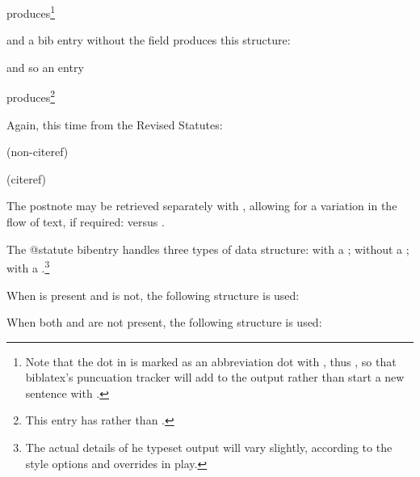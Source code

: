 produces\footnote{Note that the dot  in  is marked as an abbreviation dot with , thus , so that biblatex's puncuation tracker will add  to the output rather than start a new sentence with .}
\begin{myquotation}
\end{myquotation}
and a bib entry without the  field produces this structure:

\begin{myquotation}
\end{myquotation}
and so an entry

produces\footnote{This entry has  rather than .}
\begin{myquotation}
\end{myquotation}

\p Again, this time from the Revised Statutes:
\begin{myquotation}
\noindent{} {\footnotesize (non-citeref)}

\noindent{} {\footnotesize (citeref)}
\end{myquotation}

\p The postnote may be retrieved separately with , allowing for a variation in the flow of text, if required:  versus .

\p The @statute bibentry handles three types of data structure: with a ; without a ; with a .\footnote{The actual details of he typeset output will vary slightly, according to the style options and overrides in play.}

\p When  is present and  is not, the following structure is used:

\begin{myquotation}
\end{myquotation}

\p When both  and  are not present, the following structure is used:

\begin{myquotation}
\end{myquotation}


